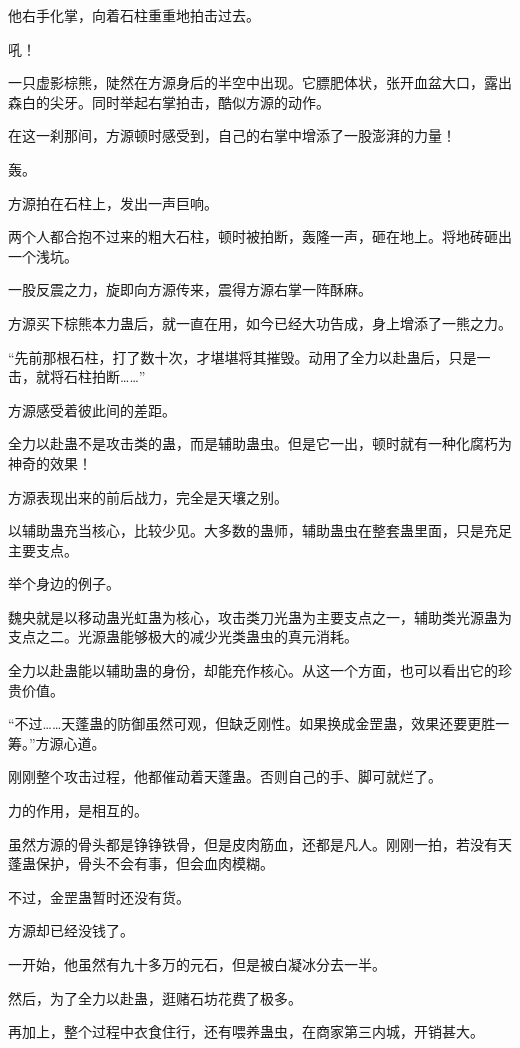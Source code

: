\begin{this_body}
他右手化掌，向着石柱重重地拍击过去。

吼！

一只虚影棕熊，陡然在方源身后的半空中出现。它膘肥体状，张开血盆大口，露出森白的尖牙。同时举起右掌拍击，酷似方源的动作。

在这一刹那间，方源顿时感受到，自己的右掌中增添了一股澎湃的力量！

轰。

方源拍在石柱上，发出一声巨响。

两个人都合抱不过来的粗大石柱，顿时被拍断，轰隆一声，砸在地上。将地砖砸出一个浅坑。

一股反震之力，旋即向方源传来，震得方源右掌一阵酥麻。

方源买下棕熊本力蛊后，就一直在用，如今已经大功告成，身上增添了一熊之力。

“先前那根石柱，打了数十次，才堪堪将其摧毁。动用了全力以赴蛊后，只是一击，就将石柱拍断……”

方源感受着彼此间的差距。

全力以赴蛊不是攻击类的蛊，而是辅助蛊虫。但是它一出，顿时就有一种化腐朽为神奇的效果！

方源表现出来的前后战力，完全是天壤之别。

以辅助蛊充当核心，比较少见。大多数的蛊师，辅助蛊虫在整套蛊里面，只是充足主要支点。

举个身边的例子。

魏央就是以移动蛊光虹蛊为核心，攻击类刀光蛊为主要支点之一，辅助类光源蛊为支点之二。光源蛊能够极大的减少光类蛊虫的真元消耗。

全力以赴蛊能以辅助蛊的身份，却能充作核心。从这一个方面，也可以看出它的珍贵价值。

“不过……天蓬蛊的防御虽然可观，但缺乏刚性。如果换成金罡蛊，效果还要更胜一筹。”方源心道。

刚刚整个攻击过程，他都催动着天蓬蛊。否则自己的手、脚可就烂了。

力的作用，是相互的。

虽然方源的骨头都是铮铮铁骨，但是皮肉筋血，还都是凡人。刚刚一拍，若没有天蓬蛊保护，骨头不会有事，但会血肉模糊。

不过，金罡蛊暂时还没有货。

方源却已经没钱了。

一开始，他虽然有九十多万的元石，但是被白凝冰分去一半。

然后，为了全力以赴蛊，逛赌石坊花费了极多。

再加上，整个过程中衣食住行，还有喂养蛊虫，在商家第三内城，开销甚大。


\end{this_body}
